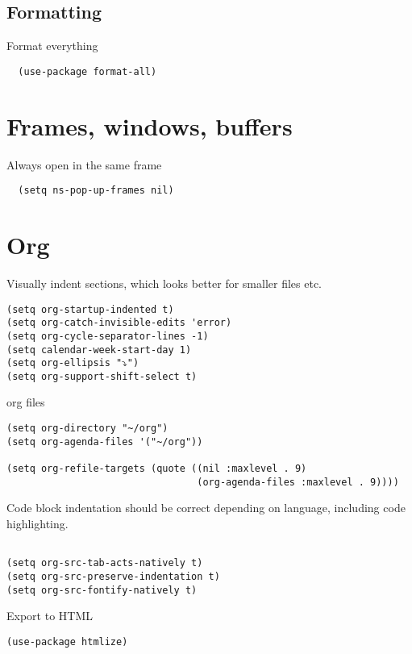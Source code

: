 \documentclass[11pt]{article}
\begin{document}
\subsection{Formatting}
\label{sec:org175ae45}

Format everything
\begin{verbatim}
  (use-package format-all)
\end{verbatim}

\section{Frames, windows, buffers}
\label{sec:org237dbdb}
Always open in the same frame
\begin{verbatim}
  (setq ns-pop-up-frames nil)
\end{verbatim}

\section{Org}
\label{sec:orga777143}

Visually indent sections, which looks better for smaller files etc.

\begin{verbatim}
(setq org-startup-indented t)
(setq org-catch-invisible-edits 'error)
(setq org-cycle-separator-lines -1)
(setq calendar-week-start-day 1)
(setq org-ellipsis "⤵")
(setq org-support-shift-select t)
\end{verbatim}

org files
\begin{verbatim}
(setq org-directory "~/org")
(setq org-agenda-files '("~/org"))

(setq org-refile-targets (quote ((nil :maxlevel . 9)
                                 (org-agenda-files :maxlevel . 9))))
\end{verbatim}

Code block indentation should be correct depending on language, including code highlighting.

\begin{verbatim}

(setq org-src-tab-acts-natively t)
(setq org-src-preserve-indentation t)
(setq org-src-fontify-natively t)

\end{verbatim}

Export to HTML
\begin{verbatim}
(use-package htmlize)
\end{verbatim}
\end{document}
